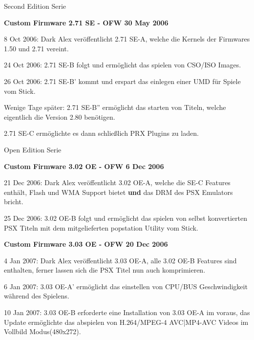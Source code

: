 \documentclass[mode=print,paper=screen,size=10pt,style=paintings]{powerdot}
\begin{document}
\begin{slide}{Second Edition Serie}
	\begin{large}\textbf{Custom Firmware 2.71 SE - OFW 30 May 2006}\end{large}
	\begin{list}{-}{}
		\item{8 Oct 2006: Dark Alex veröffentlicht 2.71 SE-A, welche die Kernels der Firmwares 1.50 und 2.71 vereint.}
		\item{24 Oct 2006: 2.71 SE-B folgt und ermöglicht das spielen von CSO/ISO Images.}
		\item{26 Oct 2006: 2.71 SE-B' kommt und erspart das einlegen einer UMD für Spiele vom Stick.}
		\item{Wenige Tage später: 2.71 SE-B'' ermöglicht das starten von Titeln, welche eigentlich die Version 2.80 benötigen.}
		\item{2.71 SE-C ermöglichte es dann schließlich PRX Plugins zu laden.}
	\end{list}
\end{slide}

\begin{slide}{Open Edition Serie}
	\begin{large}\textbf{Custom Firmware 3.02 OE - OFW 6 Dec 2006}\end{large}
	\begin{list}{-}{}
		\item{21 Dec 2006: Dark Alex veröffentlicht 3.02 OE-A, welche die SE-C Features enthält, Flash und WMA Support bietet 
			\textbf{und} das DRM des PSX Emulators bricht.}
		\item{25 Dec 2006: 3.02 OE-B folgt und ermöglicht das spielen von selbst konvertierten PSX Titeln mit dem mitgelieferten 
			popstation Utility vom Stick.}
	\end{list}
	\begin{large}\textbf{Custom Firmware 3.03 OE - OFW 20 Dec 2006}\end{large}
	\begin{list}{-}{}
		\item{4 Jan 2007: Dark Alex veröffentlicht 3.03 OE-A, alle 3.02 OE-B Features sind enthalten, ferner lassen sich die
			PSX Titel nun auch komprimieren.}
		\item{6 Jan 2007: 3.03 OE-A' ermöglicht das einstellen von CPU/BUS Geschwindigkeit während des Spielens.}
		\item{10 Jan 2007: 3.03 OE-B erforderte eine Installation von 3.03 OE-A im voraus, das Update ermöglichte das abspielen
			von H.264/MPEG-4 AVC|MP4-AVC Videos im Vollbild Modus(480x272).}
	\end{list}
\end{slide}
\end{document}
